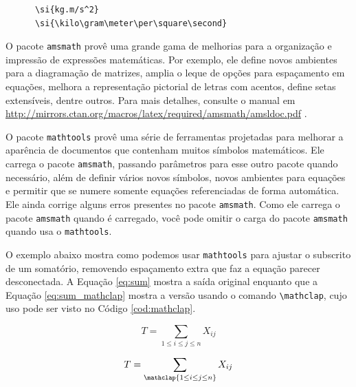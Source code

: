 \begin{listing}[ht]
	\begin{verbatim}
	  \si{kg.m/s^2}
	  \si{\kilo\gram\meter\per\square\second}	
	\end{verbatim}
	\caption{Código \LaTeX{} usado para gerar a unidade $\si{\kilo\gram\meter\per\square\second}$.}
	\label{cod:sunitx}
\end{listing}

O pacote \texttt{amsmath} provê uma grande gama de melhorias para a organização e impressão de expressões matemáticas. Por exemplo, ele define novos ambientes para a diagramação de matrizes, amplia o leque de opções para espaçamento em equações, melhora a representação pictorial de letras com acentos, define setas extensíveis, dentre outros. Para mais detalhes, consulte o manual em \url{http://mirrors.ctan.org/macros/latex/required/amsmath/amsldoc.pdf} \parencite{amsmath}.

O pacote \texttt{mathtools} provê uma série de ferramentas projetadas para melhorar a aparência de documentos que contenham muitos símbolos matemáticos. Ele carrega o pacote \texttt{amsmath}, passando parâmetros para esse outro pacote quando necessário, além de definir vários novos símbolos, novos ambientes para equações e permitir que se numere somente equações referenciadas de forma automática. Ele ainda corrige alguns erros presentes no pacote \texttt{amsmath}. Como ele carrega o pacote \texttt{amsmath} quando é carregado, você pode omitir o carga do pacote \texttt{amsmath} quando usa o \texttt{mathtools}.

O exemplo abaixo mostra como podemos usar \texttt{mathtools} para ajustar o subscrito de um somatório, removendo espaçamento extra que faz a equação parecer desconectada. A Equação \ref{eq:sum} mostra a saída original enquanto que a Equação \ref{eq:sum_mathclap} mostra a versão usando o comando \texttt{\textbackslash mathclap}, cujo uso pode ser visto no Código \ref{cod:mathclap}.

\begin{equation}
	 T = \sum_{1\le i\le j\le n} X_{ij}
	 \label{eq:sum}
\end{equation}

\begin{equation}
	T = \sum_{\mathclap{1\le i\le j\le n}} X_{ij}
	\label{eq:sum_mathclap}
\end{equation}

